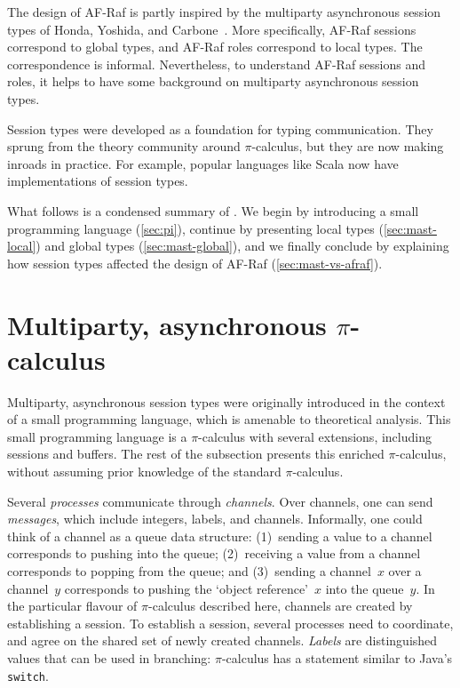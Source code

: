 \documentclass[a4paper,12pt,oneside,fleqn]{book} %
\begin{document}
The design of AF-Raf is partly inspired
  by the multiparty asynchronous session types
  of Honda, Yoshida, and Carbone~\cite{DBLP:journals/jacm/HondaYC16}.
More specifically,
  AF-Raf sessions correspond to global types,
  and AF-Raf roles correspond to local types.
The correspondence is informal.
Nevertheless,
  to understand AF-Raf sessions and roles,
  it helps to have some background on multiparty asynchronous session types.

Session types were developed as a foundation for typing communication.
They sprung from the theory community around $\pi$-calculus,
  but they are now making inroads in practice.
For example, popular languages like Scala
  now have implementations of session types.

What follows is a condensed summary of \cite{DBLP:journals/jacm/HondaYC16}.
We begin by introducing a small programming language (\autoref{sec:pi}),
  continue by presenting
    local types (\autoref{sec:mast-local})
    and global types (\autoref{sec:mast-global}),
  and we finally conclude by explaining how session types affected the
    design of AF-Raf (\autoref{sec:mast-vs-afraf}).


\section{Multiparty, asynchronous $\pi$-calculus}
\label{sec:pi}

Multiparty, asynchronous session types were originally introduced
  in the context of a small programming language,
    which is amenable to theoretical analysis.
This small programming language
  is a $\pi$-calculus with several extensions,
  including sessions and buffers.
The rest of the subsection presents this enriched $\pi$-calculus,
  without assuming prior knowledge of the standard $\pi$-calculus.

Several \emph{processes} communicate through \emph{channels}.
Over channels, one can send \emph{messages},
  which include integers, labels, and channels.
Informally, one could think of a channel as a queue data structure:
(1)~sending a value to a channel corresponds to pushing into the queue;
(2)~receiving a value from a channel corresponds to popping from the queue;
and
(3)~sending a channel~$x$ over a channel~$y$ corresponds to
  pushing the `object reference'~$x$ into the queue~$y$.
In the particular flavour of $\pi$-calculus described here,
  channels are created by establishing a session.
To establish a session,
  several processes need to coordinate,
  and agree on the shared set of newly created channels.
\emph{Labels} are distinguished values that can be used in branching:
  $\pi$-calculus has a statement similar to Java's {\tt switch}.
\end{document}
